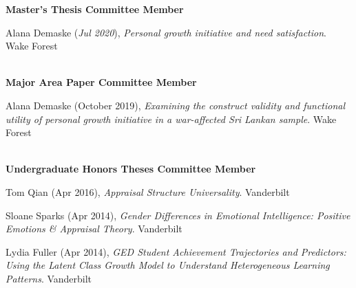 {\large \textbf{Master's Thesis Committee Member}}%
\begin{etaremune}%
\item Alana Demaske (\textit{Jul 2020}), \textit{Personal growth initiative and need satisfaction}. Wake Forest%
\end{etaremune}\\

{\large \textbf{Major Area Paper Committee Member}}%
\begin{etaremune}%
\item Alana Demaske (October 2019), \textit{Examining the construct validity and functional utility of personal growth initiative in a war-affected Sri Lankan sample}. Wake Forest%
\end{etaremune}\\
%
{\large \textbf{Undergraduate Honors Theses Committee Member}}
\begin{etaremune}\item Tom Qian (Apr 2016), \textit{Appraisal Structure Universality}. Vanderbilt%
%
\item Sloane Sparks (Apr 2014), \textit{Gender Differences in Emotional Intelligence: Positive Emotions \& Appraisal Theory}. Vanderbilt%
\item Lydia Fuller (Apr 2014), \textit{GED Student Achievement Trajectories and Predictors: Using the Latent Class Growth Model to Understand Heterogeneous Learning Patterns}. Vanderbilt%
\end{etaremune}
